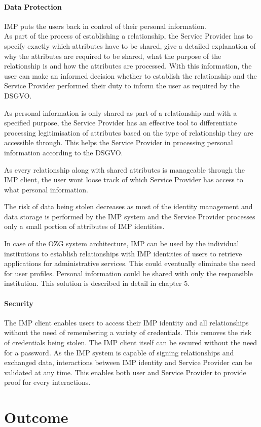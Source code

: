 \paragraph{Data Protection}

IMP puts the users back in control of their personal information. \\
As part of the process of establishing a relationship, the Service Provider has to specify exactly which attributes have to be shared, give a detailed explanation of why the attributes are required to be shared, what the purpose of the relationship is and how the attributes are processed. With this information, the user can make an informed decision whether to establish the relationship and the Service Provider performed their duty to inform the user as required by the DSGVO.

As personal information is only shared as part of a relationship and with a specified purpose, the Service Provider has an effective tool to differentiate processing legitimisation of attributes based on the type of relationship they are accessible through. This helps the Service Provider in processing personal information according to the DSGVO.

As every relationship along with shared attributes is manageable through the IMP client, the user wont loose track of which Service Provider has access to what personal information.

The risk of data being stolen decreases as most of the identity management and data storage is performed by the IMP system and the Service Provider processes only a small portion of attributes of IMP identities.

In case of the OZG system architecture, IMP can be used by the individual institutions to establish relationships with IMP identities of users to retrieve applications for administrative services. This could eventually eliminate the need for user profiles. Personal information could be shared with only the responsible institution. This solution is described in detail in chapter 5.

\paragraph{Security}

The IMP client enables users to access their IMP identity and all relationships without the need of remembering a variety of credentials. This removes the risk of credentials being stolen. The IMP client itself can be secured without the need for a password. As the IMP system is capable of signing relationships and exchanged data, interactions between IMP identity and Service Provider can be validated at any time. This enables both user and Service Provider to provide proof for every interactions.


\section{Outcome}